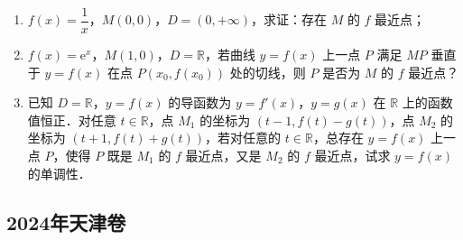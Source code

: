 \begin{description}
\begin{enumerate}[leftmargin=5pt]
        \begin{enumerate}[label=(\arabic*)]
            \item $f(x)=\dfrac{1}{x}$，$M(0,0)$，$D=(0,+\infty)$，求证：存在 $M$ 的 $f$ 最近点；
            \item $f(x)=\mathrm{e}^x$，$M(1,0)$，$D=\mathbb{R}$，若曲线 $y=f(x)$ 上一点 $P$ 满足 $MP$ 垂直于 $y=f(x)$ 在点 $P(x_0,f(x_0))$ 处的切线，则 $P$ 是否为 $M$ 的 $f$ 最近点？
            \item 已知 $D=\mathbb{R}$，$y=f(x)$ 的导函数为 $y=f'(x)$，$y=g(x)$ 在 $\mathbb{R}$ 上的函数值恒正．对任意 $t\in\mathbb{R}$，点 $M_1$ 的坐标为 $(t-1,f(t)-g(t))$，点 $M_2$ 的坐标为 $(t+1,f(t)+g(t))$，若对任意的 $t\in\mathbb{R}$，总存在 $y=f(x)$ 上一点 $P$，使得 $P$ 既是 $M_1$ 的 $f$ 最近点，又是 $M_2$ 的 $f$ 最近点，试求 $y=f(x)$ 的单调性．
        \end{enumerate}
    \end{enumerate}
\end{description}
\clearpage


\subsection{2024年天津卷}\label{gk:2024年天津卷}

